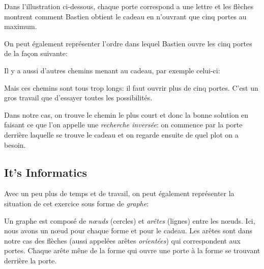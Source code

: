 \documentclass[a4paper,11pt]{report}
\newcommand{\taskGraphicsFolder}{..}
\begin{document}
{\centering%
\par}

Dans l’illustration ci-dessous, chaque porte correspond a une lettre et les flèches montrent comment Bastien obtient le cadeau en n’ouvrant que cinq portes au maximum.

{\centering%
\par}

On peut également représenter l’ordre dans lequel Bastien ouvre les cinq portes de la façon suivante:

{\centering%
\par}

Il y a aussi d’autres chemins menant au cadeau, par exemple celui-ci:

{\centering%
\par}

Mais ces chemins sont tous trop longs: il faut ouvrir plus de cinq portes. C’est un gros travail que d’essayer toutes les possibilités.

Dans notre cas, on trouve le chemin le plus court et donc la bonne solution en faisant ce que l’on appelle une \emph{recherche inversée}: on commence par la porte derrière laquelle se trouve le cadeau et on regarde ensuite de quel plot on a besoin.


\subsection*{It’s Informatics}

Avec un peu plus de temps et de travail, on peut également représenter la situation de cet exercice sous forme de \emph{graphe}:

{\centering%
\par}

Un graphe est composé de \emph{nœuds} (cercles) et \emph{arêtes} (lignes) entre les nœuds. Ici, nous avons un nœud pour chaque forme et pour le cadeau. Les arêtes sont dans notre cas des flèches (aussi appelées arêtes \emph{orientées}) qui correspondent aux portes. Chaque arête mêne de la forme qui ouvre une porte à la forme se trouvant derrière la porte.
\end{document}
